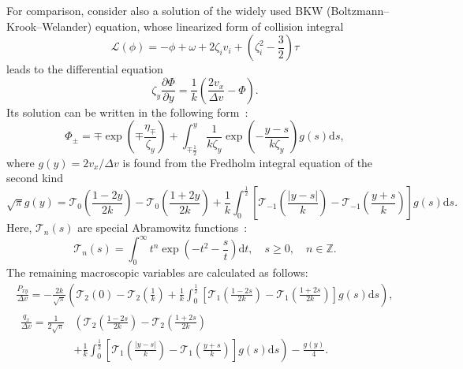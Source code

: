 \documentclass[review]{elsarticle}
\newcommand{\dd}{\mathrm{d}}
\newcommand{\pder}[2][]{\frac{\partial#1}{\partial#2}}
\begin{document}
For comparison, consider also a solution of the widely used BKW (Boltzmann--Krook--Welander) equation,
whose linearized form of collision integral
\begin{equation}\label{eq:linear_bkw}
    \mathcal{L}(\phi) = -\phi + \omega + 2\zeta_i v_i + \left(\zeta_i^2-\frac32\right)\tau
\end{equation}
leads to the differential equation
\begin{equation}\label{eq:linear_bkw_equation}
    \zeta_y \pder[\Phi]{y} = \frac1{k}\left( \frac{2v_x}{\Delta{v}} - \Phi \right).
\end{equation}
Its solution can be written in the following form~\citep{Willis1962}:
\begin{equation}\label{eq:bkw_solution}
    \Phi_\pm = \mp \exp\left(\mp\frac{\eta_\mp}{\zeta_y}\right) +
        \int_{\mp\frac12}^y \frac1{k\zeta_y} \exp \left(-\frac{y-s}{k\zeta_y}\right) g(s) \dd{s},
\end{equation}
where \(g(y) = 2v_x/\Delta v\) is found from the Fredholm integral equation of the second kind
\begin{equation}\label{eq:bkw_g_equation}
    \sqrt{\pi} g(y) = \mathcal{T}_0 \left(\frac{1-2y}{2k}\right) - \mathcal{T}_0 \left(\frac{1+2y}{2k}\right)
        + \frac1k \int_0^{\frac12} \left[ \mathcal{T}_{-1}\left(\frac{|y-s|}{k}\right)
        - \mathcal{T}_{-1}\left(\frac{y+s}{k}\right) \right] g(s) \dd{s}.
\end{equation}
Here, \(\mathcal{T}_n(s)\) are special Abramowitz functions~\citep{Abramowitz1972}:
\begin{equation}\label{eq:Abramowitz}
    \mathcal{T}_n(s) = \int_0^\infty t^n \exp\left(-t^2-\frac{s}{t}\right) \dd t,
    \quad s\ge0, \quad n \in \mathbb{Z}.
\end{equation}
The remaining macroscopic variables are calculated as follows:
\begin{gather}
    \frac{P_{xy}}{\Delta v} = -\frac{2k}{\sqrt{\pi}} \left(
        \mathcal{T}_2(0)-\mathcal{T}_2\left(\frac1k\right)
        + \frac1k\int_0^{\frac12}\left[
            \mathcal{T}_1\left(\frac{1-2s}{2k}\right)-\mathcal{T}_1\left(\frac{1+2s}{2k}\right)
        \right]g(s)\dd{s}
        \right), \label{eq:bkw_macro_Pxy} \\
    \begin{aligned}
    \frac{q_x}{\Delta v} = \frac1{2\sqrt{\pi}}&\left(
        \mathcal{T}_2\left(\frac{1-2s}{2k}\right) - \mathcal{T}_2\left(\frac{1+2s}{2k}\right)\right. \\
        &+\left. \frac1k\int_0^{\frac12}\left[
            \mathcal{T}_1\left(\frac{|y-s|}k\right)-\mathcal{T}_1\left(\frac{y+s}k\right)
        \right]g(s)\dd{s}
        \right) - \frac{g(y)}4.
    \end{aligned} \label{eq:bkw_macro_qx}
\end{gather}
\end{document}
